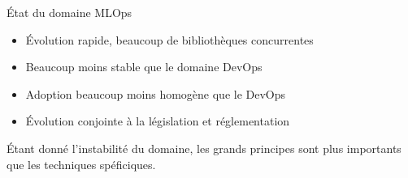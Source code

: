 \begin{frame}{État du domaine MLOps}
  \begin{itemize}
    \item Évolution rapide, beaucoup de bibliothèques concurrentes
    \item Beaucoup moins stable que le domaine DevOps
    \item Adoption beaucoup moins homogène que le DevOps
    \item Évolution conjointe à la législation et réglementation
  \end{itemize}

  Étant donné l'instabilité du domaine, les grands principes sont plus importants que les techniques spéficiques.
\end{frame}
